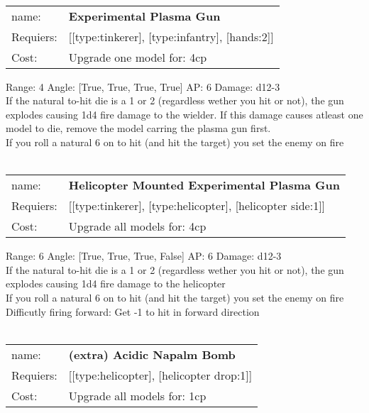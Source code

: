 \ \\
\begin{tabular}{ll}
name: & {\bf Experimental Plasma Gun } \\
Requiers: & [[type:tinkerer], [type:infantry], [hands:2]] \\
Cost: & Upgrade one model for: 4cp \\
\end{tabular}



Range: 4  Angle: [True, True, True, True] AP: 6 Damage: d12-3 \\
If the natural to-hit die is a 1 or 2 (regardless wether you hit or not), the gun explodes causing 1d4 fire damage to the wielder. If this damage causes atleast one model to die, remove the model carring the plasma gun first.\\ 
If you roll a natural 6 on to hit (and hit the target) you set the enemy on fire\\ 








\ \\
\begin{tabular}{ll}
name: & {\bf Helicopter Mounted Experimental Plasma Gun } \\
Requiers: & [[type:tinkerer], [type:helicopter], [helicopter side:1]] \\
Cost: & Upgrade all models for: 4cp \\
\end{tabular}



Range: 6  Angle: [True, True, True, False] AP: 6 Damage: d12-3 \\
If the natural to-hit die is a 1 or 2 (regardless wether you hit or not), the gun explodes causing 1d4 fire damage to the helicopter\\ 
If you roll a natural 6 on to hit (and hit the target) you set the enemy on fire\\ 
Difficutly firing forward: Get -1 to hit in forward direction\\ 








\ \\
\begin{tabular}{ll}
name: & {\bf (extra) Acidic Napalm Bomb } \\
Requiers: & [[type:helicopter], [helicopter drop:1]] \\
Cost: & Upgrade all models for: 1cp \\
\end{tabular}



